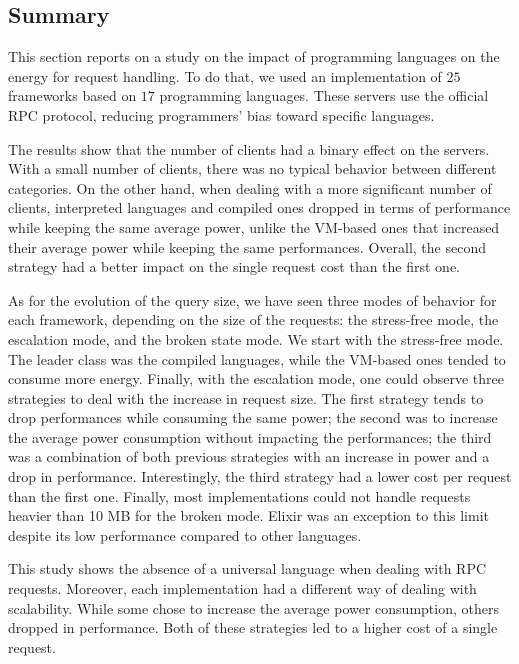 
\subsection{Summary}

This section reports on a study on the impact of programming languages on the energy for request handling.
To do that, we used an implementation of $25$ frameworks based on $17$ programming languages.
These servers use the official RPC protocol, reducing programmers' bias toward specific languages.

The results show that the number of clients had a binary effect on the servers.
With a small number of clients, there was no typical behavior between different categories.
On the other hand, when dealing with a more significant number of clients, interpreted languages and compiled ones dropped in terms of performance while keeping the same average power, unlike the VM-based ones that increased their average power while keeping the same performances.
Overall, the second strategy had a better impact on the single request cost than the first one.

As for the evolution of the query size, we have seen three modes of behavior for each framework, depending on the size of the requests: the stress-free mode, the escalation mode, and the broken state mode.
We start with the stress-free mode.
The leader class was the compiled languages, while the VM-based ones tended to consume more energy.
Finally, with the escalation mode, one could observe three strategies to deal with the increase in request size.
The first strategy tends to drop performances while consuming the same power; the second was to increase the average power consumption without impacting the performances; the third was a combination of both previous strategies with an increase in power and a drop in performance.
Interestingly, the third strategy had a lower cost per request than the first one.
Finally, most implementations could not handle requests heavier than 10 MB for the broken mode.
Elixir was an exception to this limit despite its low performance compared to other languages.

This study shows the absence of a universal language when dealing with RPC requests.
Moreover, each implementation had a different way of dealing with scalability.
While some chose to increase the average power consumption, others dropped in performance.
Both of these strategies led to a higher cost of a single request.

\clearpage